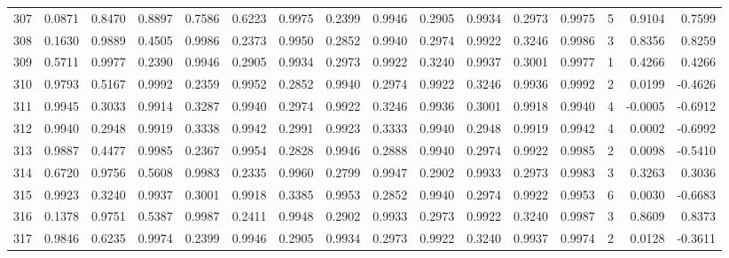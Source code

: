 \begin{tabular}{lrrrrrrrrrrrrrrr}
307 &      0.0871 &  0.8470 &  0.8897 &  0.7586 &  0.6223 &  0.9975 &  0.2399 &  0.9946 &  0.2905 &  0.9934 &   0.2973 &     0.9975 &      5 &                    0.9104 &                     0.7599 \\
308 &      0.1630 &  0.9889 &  0.4505 &  0.9986 &  0.2373 &  0.9950 &  0.2852 &  0.9940 &  0.2974 &  0.9922 &   0.3246 &     0.9986 &      3 &                    0.8356 &                     0.8259 \\
309 &      0.5711 &  0.9977 &  0.2390 &  0.9946 &  0.2905 &  0.9934 &  0.2973 &  0.9922 &  0.3240 &  0.9937 &   0.3001 &     0.9977 &      1 &                    0.4266 &                     0.4266 \\
310 &      0.9793 &  0.5167 &  0.9992 &  0.2359 &  0.9952 &  0.2852 &  0.9940 &  0.2974 &  0.9922 &  0.3246 &   0.9936 &     0.9992 &      2 &                    0.0199 &                    -0.4626 \\
311 &      0.9945 &  0.3033 &  0.9914 &  0.3287 &  0.9940 &  0.2974 &  0.9922 &  0.3246 &  0.9936 &  0.3001 &   0.9918 &     0.9940 &      4 &                   -0.0005 &                    -0.6912 \\
312 &      0.9940 &  0.2948 &  0.9919 &  0.3338 &  0.9942 &  0.2991 &  0.9923 &  0.3333 &  0.9940 &  0.2948 &   0.9919 &     0.9942 &      4 &                    0.0002 &                    -0.6992 \\
313 &      0.9887 &  0.4477 &  0.9985 &  0.2367 &  0.9954 &  0.2828 &  0.9946 &  0.2888 &  0.9940 &  0.2974 &   0.9922 &     0.9985 &      2 &                    0.0098 &                    -0.5410 \\
314 &      0.6720 &  0.9756 &  0.5608 &  0.9983 &  0.2335 &  0.9960 &  0.2799 &  0.9947 &  0.2902 &  0.9933 &   0.2973 &     0.9983 &      3 &                    0.3263 &                     0.3036 \\
315 &      0.9923 &  0.3240 &  0.9937 &  0.3001 &  0.9918 &  0.3385 &  0.9953 &  0.2852 &  0.9940 &  0.2974 &   0.9922 &     0.9953 &      6 &                    0.0030 &                    -0.6683 \\
316 &      0.1378 &  0.9751 &  0.5387 &  0.9987 &  0.2411 &  0.9948 &  0.2902 &  0.9933 &  0.2973 &  0.9922 &   0.3240 &     0.9987 &      3 &                    0.8609 &                     0.8373 \\
317 &      0.9846 &  0.6235 &  0.9974 &  0.2399 &  0.9946 &  0.2905 &  0.9934 &  0.2973 &  0.9922 &  0.3240 &   0.9937 &     0.9974 &      2 &                    0.0128 &                    -0.3611 \\

\end{tabular}
